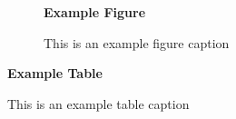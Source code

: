 \documentclass{omgrpt}
\begin{document}
\label{ocl-1:examples}
\lipsum[1]

\begin{figure}
  \centering
  \centerline{\Large\textbf{Example Figure}}
  \caption{This is an example figure caption}
\end{figure}

\begin{table}
  \centering
  \centerline{\Large\textbf{Example Table}}  
  \caption{This is an example table caption}
  \label{tab:asdf}
\end{table}

\label{ocl-2:examples}
\lipsum[2-3]

\label{ocl-3:examples}
\lipsum[2-3]

\label{ocl-4:examples}
\lipsum[2-3]

\label{ocl-0:examples}
\lipsum[2-3]
\end{document}
